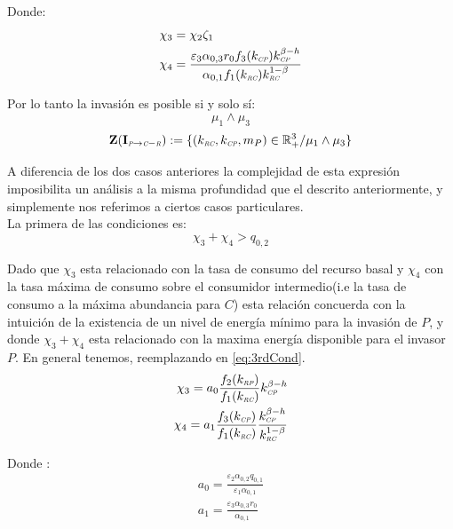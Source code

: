 Donde:
\begin{equation}\label{eq:3rdCond}
  \begin{aligned}
    \chi_3 &= \chi_2 \zeta_1 \\
    \chi_4 &= \frac{\varepsilon_3 \alpha_{0,3}r_0 f_3(k_{\textit{\tiny CP}})k_{\textit{\tiny CP}}^{\beta - h}}{\alpha_{0,1}f_1(k_{\textit{\tiny RC}})k_{\textit{\tiny RC}}^{1-\beta}}
  \end{aligned}
\end{equation}

Por lo tanto la invasi\'on es posible si y solo s\'i:
\begin{equation}
  \mu_1 \land \mu_3
\end{equation}
\begin{equation}
\mathbf{Z(I_{\textit{\tiny P} \to \textit{\tiny C}-\textit{\tiny R}})} := \{ (k_{\textit{\tiny RC}},k_{\textit{\tiny CP}},m_P) \in \mathbb{R}^3_+ / \mu_1 \land \mu_3 \}
\end{equation}

A diferencia de los dos casos anteriores la complejidad de esta expresi\'on imposibilita un an\'alisis a la misma profundidad que el descrito anteriormente, y simplemente nos referimos a ciertos casos particulares.\\

La primera de las condiciones es:
\begin{equation}
  \chi_3 + \chi_4 > q_{0,2}
\end{equation}

Dado que $\chi_3$ esta relacionado con la tasa de consumo del recurso basal y $\chi_4$ con la tasa m\'axima de consumo sobre el consumidor intermedio(i.e la tasa de consumo a la m\'axima abundancia para $C$) esta relaci\'on concuerda con la intuici\'on de la existencia de un nivel de energ\'ia m\'inimo para la invasi\'on de $P$, y donde $\chi_3 + \chi_4$ esta relacionado con la maxima energ\'ia disponible para el invasor $P$.
En general tenemos, reemplazando en \eqref{eq:3rdCond}.
\begin{equation}
  \begin{aligned}
    \chi_3 = a_0 \frac{f_2(k_{\textit{\tiny RP}})}{f_1(k_{\textit{\tiny RC}})} k_{\textit{\tiny CP}}^{\beta-h} \\
    \chi_4 = a_1 \frac{f_3(k_{\textit{\tiny CP}})}{f_1(k_{\textit{\tiny RC}})} \frac{k_{\textit{\tiny CP}}^{\beta - h}}{k_{\textit{\tiny RC}}^{1-\beta}}
  \end{aligned}
\end{equation}

Donde :
\begin{equation}
  \begin{aligned}
    a_0 = \frac{\varepsilon_2 \alpha_{0,2} q_{0,1}}{\varepsilon_1 \alpha_{0,1}} \\
    a_1 = \frac{\varepsilon_3 \alpha_{0,3} r_0}{\alpha_{0,1}}
  \end{aligned}
\end{equation}

